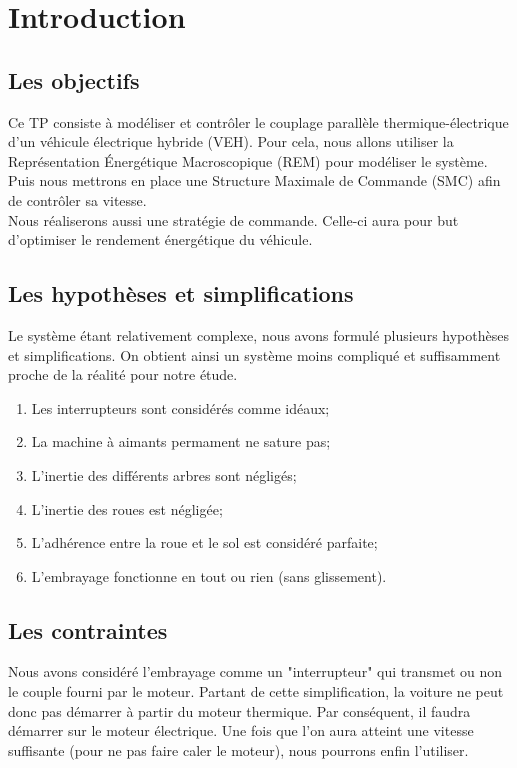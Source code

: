 \section{Introduction}

\subsection{Les objectifs}

	Ce TP consiste à modéliser et contrôler le couplage parallèle thermique-électrique d'un véhicule électrique hybride (VEH). Pour cela, nous allons utiliser la Représentation Énergétique Macroscopique (REM) pour modéliser le système. Puis nous mettrons en place une Structure Maximale de Commande (SMC) afin de contrôler sa vitesse. \\
	Nous réaliserons aussi une stratégie de commande. Celle-ci aura pour but d'optimiser le rendement énergétique du véhicule.

\subsection{Les hypothèses et simplifications}

	Le système étant relativement complexe, nous avons formulé plusieurs hypothèses et simplifications. On obtient ainsi un système moins compliqué et suffisamment proche de la réalité pour notre étude. 

\begin{enumerate} 
\item Les interrupteurs sont considérés comme idéaux;
\item La machine à aimants permament ne sature pas;
\item L'inertie des différents arbres sont négligés;
\item L'inertie des roues est négligée;
\item L'adhérence entre la roue et le sol est considéré parfaite;
\item L'embrayage fonctionne en tout ou rien (sans glissement).
\end{enumerate}

\subsection{Les contraintes}
	Nous avons considéré l'embrayage comme un "interrupteur" qui transmet ou non le couple fourni par le moteur. Partant de cette simplification, la voiture ne peut donc pas démarrer à partir du moteur thermique. Par conséquent, il faudra démarrer sur le moteur électrique. Une fois que l'on aura atteint une vitesse suffisante (pour ne pas faire caler le moteur), nous pourrons enfin l'utiliser.

